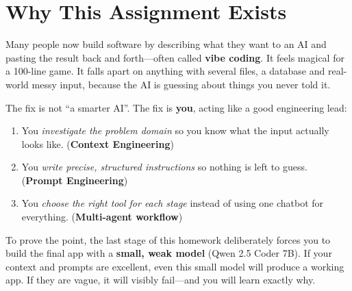 \documentclass[11pt,a4paper]{article}
\begin{document}
\tableofcontents
\newpage

\section{Why This Assignment Exists}
Many people now build software by describing what they want to an AI and pasting the result back and forth---often called \textbf{vibe coding}. It feels magical for a 100-line game. It falls apart on anything with several files, a database and real-world messy input, because the AI is guessing about things you never told it.

The fix is not ``a smarter AI''. The fix is \textbf{you}, acting like a good engineering lead:
\begin{enumerate}
\item You \emph{investigate the problem domain} so you know what the input actually looks like. (\textbf{Context Engineering})
\item You \emph{write precise, structured instructions} so nothing is left to guess. (\textbf{Prompt Engineering})
\item You \emph{choose the right tool for each stage} instead of using one chatbot for everything. (\textbf{Multi-agent workflow})
\end{enumerate}

To prove the point, the last stage of this homework deliberately forces you to build the final app with a \textbf{small, weak model} (Qwen 2.5 Coder 7B). If your context and prompts are excellent, even this small model will produce a working app. If they are vague, it will visibly fail---and you will learn exactly why.
\end{document}
